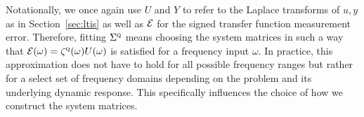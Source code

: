 Notationally, we once again use $U$ and $Y$ to refer to the Laplace transforms of $u, y$ as in Section~\ref{sec:ltis} as well as $\mathcal{E}$ for the signed transfer function measurement error.
Therefore, fitting $\Sigma^{\textnormal{\scshape q}}$ means choosing the system matrices in such a way that $\mathcal{E}(\omega) = \zeta^{\textnormal{\scshape q}}(\omega) U(\omega)$ is satisfied for a frequency input $\omega$.
In practice, this approximation does not have to hold for all possible frequency ranges but rather for a select set of frequency domains depending on the problem and its underlying dynamic response.
This specifically influences the choice of how we construct the system matrices.


